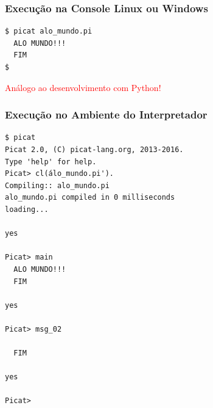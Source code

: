 \begin{frame}[fragile]
\frametitle{Execução na Console Linux ou Windows}

\begin{verbatim}
$ picat alo_mundo.pi 
  ALO MUNDO!!! 
  FIM 
$ 
\end{verbatim}

\pause
\textcolor{red}{Análogo ao desenvolvimento com Python!}

\end{frame}


\begin{frame}[fragile]
\frametitle{Execução no Ambiente do Interpretador}

\begin{footnotesize}
\begin{verbatim}
$ picat
Picat 2.0, (C) picat-lang.org, 2013-2016.
Type 'help' for help.
Picat> cl(álo_mundo.pi').
Compiling:: alo_mundo.pi
alo_mundo.pi compiled in 0 milliseconds
loading...

yes

Picat> main 
  ALO MUNDO!!! 
  FIM 

yes

Picat> msg_02

  FIM 

yes

Picat> 
\end{verbatim}

\end{footnotesize}
\end{frame}


